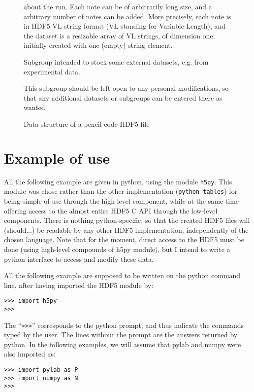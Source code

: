 \documentclass[a4paper,12pt]{article}
\begin{document}
\begin{figure}[p]
{\begin{description}
\begin{description}
\begin{description}
      about the run. Each note can be of arbitrarily long size, and a
      arbitrary number of notes can be added. More precisely, each
      note is in HDF5 VL string format (VL standing for Variable
      Length), and the dataset is a resizable array of VL strings, of
      dimension one, initially created with one (empty) string
      element.
    \item[/etc/ext/] Subgroup intended to stock some external datasets,
      e.g. from experimental data.
    \item[/etc/...] This subgroup should be left open to any personal
      modifications, so that any additional datasets or subgroups can
      be entered there as wanted.
    \end{description}
  \end{description}
\end{description}
}%
\caption{Data structure of a pencil-code HDF5 file}
\label{fig:data-struct}
\end{figure}
\section{Example of use}
\label{sec:example-use}

All the following example are given in python, using the module
\texttt{h5py}. This module was chose rather than the other
implementation (\texttt{python-tables}) for being simple of use
through the high-level component, while at the same time offering
access  to the almost entire HDF5 C API through the low-level
components. There is nothing python-specific, so that the created
HDF5 files will (should...) be readable by any other HDF5
implementation, independently of the chosen language. Note that for
the moment, direct access to the HDF5 must be done (using high-level
compounds of h5py module), but I intend to write a python interface to
access and modify these data. 

All the following example are supposed to be written on the python
command line, after having imported the HDF5 module by:
\begin{verbatim}
>>> import h5py
>>>
\end{verbatim}
The ``\texttt{>>>}'' corresponds to the python prompt, and thus indicate
the commands typed by the user. The lines without the prompt are the
answers returned by python.
In the following examples, we will assume that pylab and numpy were
also imported as:
\begin{verbatim}
>>> import pylab as P
>>> import numpy as N
>>>
\end{verbatim}
\end{document}
